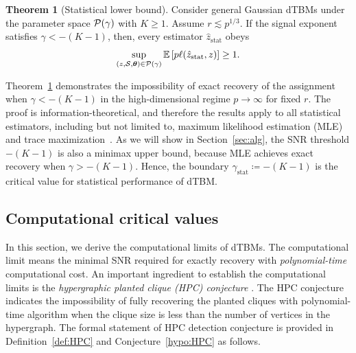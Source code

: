 \documentclass[lettersize,onecolumn,journal]{IEEEtran}
\theoremstyle{definition}
\newtheorem{thm}{Theorem}
\theoremstyle{definition}
\begin{document}
\begin{thm}[Statistical lower bound]\label{thm:stats} Consider general Gaussian dTBMs under the parameter space $\mathcal{P}(\gamma)$ with $K\geq 1$. Assume $r \lesssim p^{1/3}$. If the signal exponent satisfies $\gamma < -(K-1)$, then, every estimator $\hat z_{\text{stat}}$ obeys
\begin{equation}
    \sup_{(z, \mathcal{S}, \boldsymbol{\theta}) \in \mathcal{P}(\gamma)} \mathbb{E} \left[ p\ell(\hat z_{\text{stat}}, z) \right]\geq 1.
\end{equation}
\end{thm}
Theorem~\ref{thm:stats} demonstrates the impossibility of exact recovery of the assignment when $\gamma < -(K-1)$ in the high-dimensional regime $p\to \infty$ for fixed $r$. The proof is information-theoretical, and therefore the results apply to all statistical estimators, including but not limited to, maximum likelihood estimation (MLE)~\citep{wang2019multiway} and trace maximization~\citep{ghoshdastidar2017uniform}. As we will show in Section~\ref{sec:alg}, the SNR threshold $-(K-1)$ is also a minimax upper bound, because MLE achieves exact recovery when $\gamma > -(K-1)$. Hence, the boundary $\gamma_{\text{stat}} \coloneqq -(K-1)$ is the critical value for statistical performance of dTBM. 


\subsection{Computational critical values}\label{sec:complimit}
In this section, we derive the computational limits of dTBMs. The computational limit means the minimal SNR required for exactly recovery with \emph{polynomial-time} computational cost. An important ingredient to establish the computational limits is the \emph{hypergraphic planted clique (HPC) conjecture} \citep{zhang2018tensor, brennan2020reducibility}. The HPC conjecture indicates the impossibility of fully recovering the planted cliques with polynomial-time algorithm when the clique size is less than the number of vertices in the hypergraph. The formal statement of HPC detection conjecture is provided in Definition~\ref{def:HPC} and Conjecture~\ref{hypo:HPC} as follows.  
\end{document}
